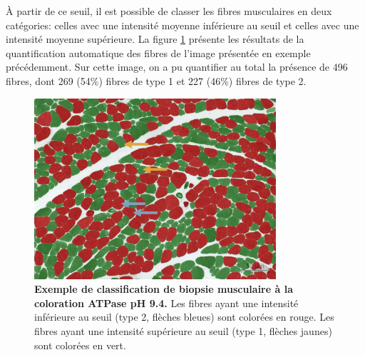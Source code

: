 À partir de ce seuil, il est possible de classer les fibres musculaires en deux catégories: celles avec une intensité moyenne inférieure au seuil et celles avec une intensité moyenne supérieure. La figure \ref{fig:apt_paint} présente les résultats de la quantification automatique des fibres de l'image présentée en exemple précédemment. Sur cette image, on a pu quantifier au total la présence de 496 fibres, dont 269 (54\%) fibres de type 1 et 227 (46\%) fibres de type 2. 
\begin{figure}[!htbp]
 \centering
 \includegraphics[width=0.8\textwidth]{figures/atp_paint.png}
 \caption[Exemple de classification de biopsie musculaire à la coloration ATPase pH 9.4]{\textbf{Exemple de classification de biopsie musculaire à la coloration ATPase pH 9.4.} Les fibres ayant une intensité inférieure au seuil (type 2, flèches bleues) sont colorées en rouge. Les fibres ayant une intensité supérieure au seuil (type 1, flèches jaunes) sont colorées en vert.}
 \label{fig:apt_paint}
\end{figure}

